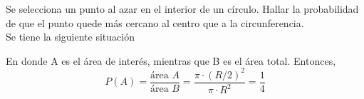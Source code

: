 \item Se selecciona un punto al azar en el interior de un círculo. Hallar la probabilidad de que el punto quede más cercano al centro que a la circunferencia.\e\\
    Se tiene la siguiente situación
    \begin{center}
    \end{center}
    En donde A es el área de interés, mientras que B es el área total. Entonces,
    \[P(A)=\frac{\text{área }A}{\text{área }B}=\frac{\pi \cdot (R/2)^2}{\pi\cdot R^2}=\frac{1}{4}\]